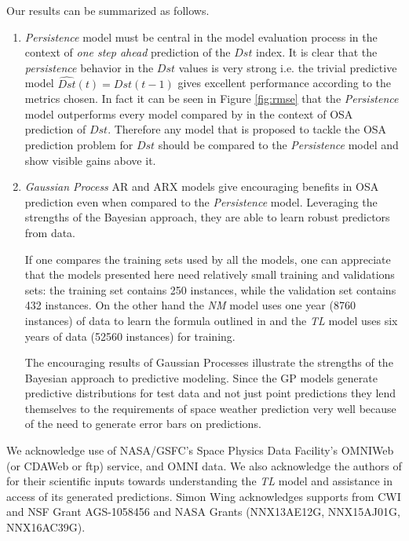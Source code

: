\documentclass[referee,a4paper,12pt,traditabstract]{swsc}
\begin{document}
\begin{linenumbers}
Our results can be summarized as follows.
   \begin{enumerate}
      \item \emph{Persistence} model must be central in the model evaluation process in the context of \emph{one step ahead} prediction of the $Dst$ index. It is clear that the \emph{persistence} behavior in the $Dst$ values is very strong i.e. the trivial predictive model $\hat{Dst}(t) = Dst(t-1)$ gives excellent performance according to the metrics chosen. In fact it can be seen in Figure \ref{fig:rmse} that the \emph{Persistence} model outperforms every model compared by \citet{Ji2012} in the context of OSA prediction of $Dst$. Therefore any model that is proposed to tackle the OSA prediction problem for $Dst$ should be compared to the \emph{Persistence} model and show visible gains above it.
      
      \item \emph{Gaussian Process} AR and ARX models give encouraging benefits in OSA prediction even when compared to the \emph{Persistence} model. Leveraging the strengths of the Bayesian approach, they are able to learn robust predictors from data. 
      
      If one compares the training sets used by all the models, one can appreciate that the models presented here need relatively small training and validations sets: the training set contains 250 instances, while the validation set contains 432 instances. On the other hand the \emph{NM} model uses one year (8760 instances) of data to learn the formula outlined in \citet{balikhin:narmax} and the \emph{TL} model uses six years of data (52560 instances) for training. 
      
      The encouraging results of Gaussian Processes illustrate the strengths of the Bayesian approach to predictive modeling. Since the GP models generate predictive distributions for test data and not just point predictions they lend themselves to the requirements of space weather prediction very well because of the need to generate error bars on predictions.
   \end{enumerate}
   

\begin{acknowledgements}
      We acknowledge use of NASA/GSFC's Space Physics Data Facility's OMNIWeb (or CDAWeb or ftp) service, and OMNI data. We also acknowledge the authors of \citet{JGRA:JGRA16300} for their scientific inputs towards understanding the \emph{TL} model and assistance in access of its generated predictions. Simon Wing acknowledges supports from CWI and NSF Grant AGS-1058456 and NASA Grants (NNX13AE12G, NNX15AJ01G, NNX16AC39G).   
\end{acknowledgements}




\end{linenumbers}
\end{document}
